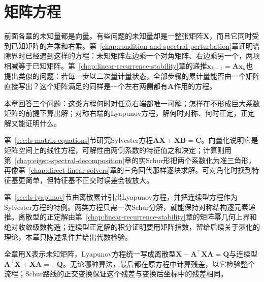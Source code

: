 \chapter{矩阵方程}
\label{chap:matrix-equations}

前面各章的未知量都是向量。有些问题的未知量却是一整张矩阵$\bm X$，而且它同时受到已知矩阵的左乘和右乘。第~\ref{chap:condition-and-spectral-perturbation}章证明谱隙界时已经遇到这样的方程：未知矩阵左边乘一个对角矩阵、右边乘另一个，两项相减等于已知矩阵。第~\ref{chap:linear-recurrence-stability}章的递推$\bm x_{k+1}=\bm A\bm x_k$也提出类似的问题：若每一步以二次量计量状态，全部步骤的累计量能否由一个矩阵直接写出？这个矩阵满足的同样是一个左右两侧都有$\bm A$作用的方程。

本章回答三个问题：这类方程何时对任意右端都唯一可解；怎样在不形成巨大系数矩阵的前提下算出解；对称右端的Lyapunov方程，解何时对称、何时正定，正定解又能证明什么。

第~\ref{sec:ls-matrix-equations}节研究Sylvester方程$\bm A\bm X+\bm X\bm B=\bm C$。向量化说明它是矩阵空间上的线性方程，可解性由两侧系数的特征值之和决定；计算则用第~\ref{chap:eigen-spectral-decomposition}章的实Schur形把两个系数化为准三角形，再像第~\ref{chap:direct-linear-solvers}章的三角回代那样逐块求解。可对角化时换到特征基更简单，但特征基不正交时误差会被放大。

第~\ref{sec:ls-lyapunov}节由离散累计引出Lyapunov方程，并把连续型方程作为Sylvester方程的特例。两类方程只需一次Schur分解，就能保持对称结构逐元素递推。离散型的正定解由第~\ref{chap:linear-recurrence-stability}章的矩阵幂几何上界和绝对收敛级数构造；连续型正定解的积分证明要用矩阵指数，留给后续关于演化的理论，本章只陈述条件并给出代数检验。

全章用$\bm X$表示未知矩阵，Lyapunov方程统一写成离散型$\bm X-\bm A^\top\bm X\bm A=\bm Q$与连续型$\bm A^\top\bm X+\bm X\bm A=-\bm Q$。无论哪种算法，最后都在原方程中计算残差，以它检验整个流程；Schur路线的正交变换保证这个残差与变换后坐标中的残差相同。




